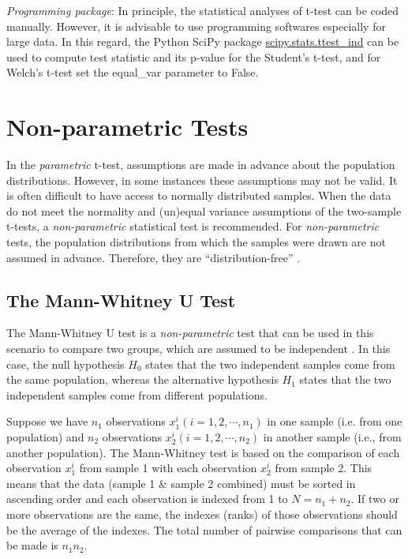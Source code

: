 \documentclass[10pt, aps,twocolumn, superscriptaddress, nofootinbib]{revtex4-2}
\begin{document}
{\it Programming package}:  In principle, the statistical analyses of t-test can be coded manually. However, it is advisable to use programming softwares especially for large data. In this regard, the Python  SciPy package  \href{https://docs.scipy.org/doc/scipy/reference/generated/scipy.stats.ttest_ind.html}{scipy.stats.ttest\_ind} can be used to compute test statistic and its p-value  for the Student's t-test, and for Welch's t-test set the equal\_var parameter to False.

\section{Non-parametric Tests}
In the {\it parametric} t-test, assumptions are made in advance about the population distributions. However, in some instances these assumptions may not be valid.   It is often difficult to have access to normally distributed samples. When the data do not meet the normality and (un)equal variance assumptions of the two-sample t-tests,   a {\it non-parametric} statistical test is recommended. For {\it non-parametric} tests, the population distributions from which the samples were drawn are not assumed in advance. Therefore, they are ``distribution-free'' \cite{s4}. 

\subsection{The Mann-Whitney U Test}
The Mann-Whitney U test is  a {\it non-parametric} test that can be used in this scenario to compare two  groups, which are assumed to be independent \cite{s4,s6,s7, s8}. In this case, the null hypothesis $H_0$ states that the two independent samples come from the same population, whereas the alternative hypothesis $H_1$ states that the two independent samples come from different populations.

 Suppose we have  $n_1$ observations $x_1^i (i=1,2,\cdots,n_1)$ in one sample (i.e. from one population) and $n_2$ observations $x_2^i (i=1,2,\cdots,n_2)$ in another sample (i.e., from another population). The Mann‐Whitney test is based on the comparison of each observation $x_1^i$ from sample 1 with each observation $x_2^i$ from  sample 2. This means that the data (sample 1 \& sample 2 combined) must be sorted in ascending order  and each observation is indexed from 1 to $N=n_1+n_2$.  If two or more observations are the same, the indexes (ranks) of those observations should be the average of the indexes. The total number of pairwise comparisons that can be made is $n_1n_2$.  
 
\end{document}
